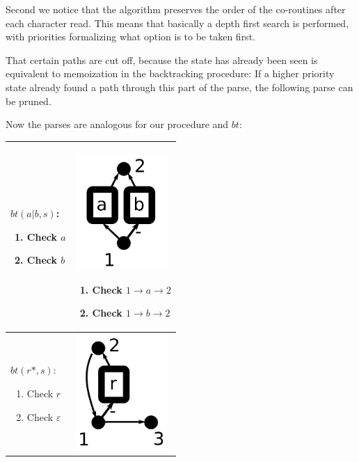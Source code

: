 \documentclass[11pt,a4paper,twoside,openright]{Thesis}
\theoremstyle{definition}
\begin{document}
Second we notice that the algorithm preserves the order of the co-routines 
after each character read. This means that basically a depth first search
is performed, with priorities formalizing what option is to be taken first.

That certain paths are cut off, because the state has already been seen is 
equivalent to memoization in the backtracking procedure: If a higher priority 
state already found a path through this part of the parse, the following 
parse can be pruned.

Now the parses are analogous for our procedure and $bt$:

\begin{center}
  \begin{tabular}{p{5cm}|p{7cm}}
    \hline \hline
    $bt(a|b, s)$:\begin{enumerate}
      \item Check $a$
      \item Check $b$
    \end{enumerate}
    &  \includegraphics[width=3.5cm]{graphs/ror}
    \begin{enumerate}
      \item Check $1\rightarrow a\rightarrow 2$
      \item Check $1\rightarrow b\rightarrow 2$
      \end{enumerate} \\ \hline
    $bt(r*, s)$:\begin{enumerate}
      \item Check $r$
      \item Check $\varepsilon$
    \end{enumerate}
    & \includegraphics[width=3.5cm]{graphs/rstar}

\end{tabular}
\end{center}
\end{document}
